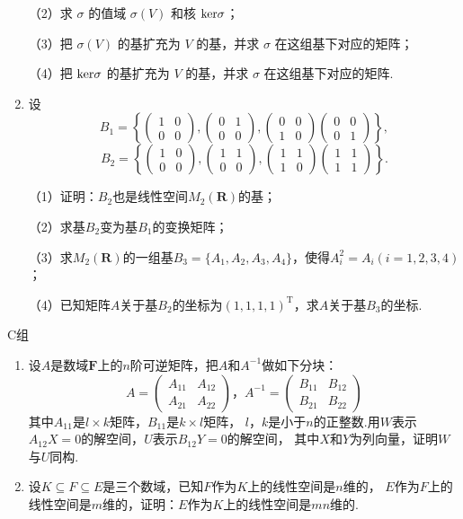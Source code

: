 \begin{enumerate}
	\textup{（2）}求 $\sigma$ 的值域 $\sigma(V)$ 和核 $\textup{ker}\sigma$；
	
	\textup{（3）}把 $\sigma(V)$ 的基扩充为 $V$ 的基，并求 $\sigma$ 在这组基下对应的矩阵；
	
	\textup{（4）}把 $\textup{ker}\sigma$ 的基扩充为 $V$ 的基，并求 $\sigma$ 在这组基下对应的矩阵.
	\item 设
	$$B_1=\left\{\begin{pmatrix}
		1 & 0 \\ 0 & 0
	\end{pmatrix},\begin{pmatrix}
		0 & 1 \\ 0 & 0
	\end{pmatrix},\begin{pmatrix}
		0 & 0 \\ 1 & 0
	\end{pmatrix}\begin{pmatrix}
		0 & 0 \\ 0 & 1
	\end{pmatrix}\right\},$$
	$$B_2=\left\{\begin{pmatrix}
		1 & 0 \\ 0 & 0
	\end{pmatrix},\begin{pmatrix}
		1 & 1 \\ 0 & 0
	\end{pmatrix},\begin{pmatrix}
		1 & 1 \\ 1 & 0
	\end{pmatrix}\begin{pmatrix}
		1 & 1 \\ 1 & 1
	\end{pmatrix}\right\}.$$

	（1）证明：$B_2$也是线性空间$M_2(\mathbf{R})$的基；

	（2）求基$B_2$变为基$B_1$的变换矩阵；

	（3）求$M_2(\mathbf{R})$的一组基$B_3=\{A_1,A_2,A_3,A_4\}$，使得$A_i^2=A_i(i=1,2,3,4)$；

	（4）已知矩阵$A$关于基$B_2$的坐标为$(1,1,1,1)^\mathrm{T}$，求$A$关于基$B_3$的坐标.
\end{enumerate}
\centerline{\heiti C组}
\begin{enumerate}
	\item 设$A$是数域$\mathbf{F}$上的$n$阶可逆矩阵，把$A$和$A^{-1}$做如下分块：
	$$A=\begin{pmatrix}
		A_{11} & A_{12} \\ A_{21} & A_{22}
	\end{pmatrix}，A^{-1}=\begin{pmatrix}
		B_{11} & B_{12} \\ B_{21} & B_{22}
	\end{pmatrix}$$
	其中$A_{11}$是$l \times k$矩阵，$B_{11}$是$k \times l$矩阵，
	$l$，$k$是小于$n$的正整数.用$W$表示$A_{12}X=0$的解空间，$U$表示$B_{12}Y=0$的解空间，
	其中$X$和$Y$为列向量，证明$W$与$U$同构.
	\item 设$K \subseteq F \subseteq E$是三个数域，已知$F$作为$K$上的线性空间是$n$维的，
	$E$作为$F$上的线性空间是$m$维的，证明：$E$作为$K$上的线性空间是$mn$维的.
\end{enumerate}
